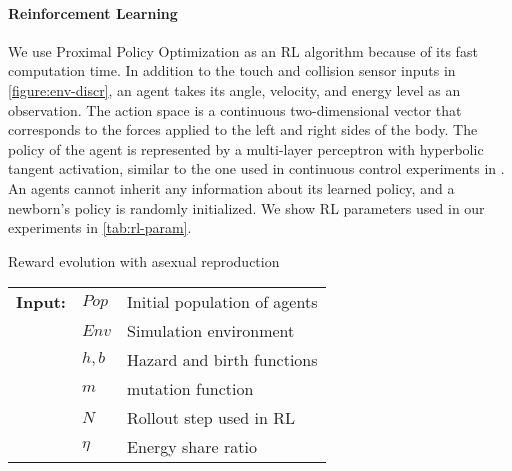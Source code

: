 \paragraph{Reinforcement Learning}
We use Proximal Policy Optimization \citep{schulmanProximalPolicyOptimization2017} as an RL algorithm because of its fast computation time. In addition to the touch and collision sensor inputs in \cref{figure:env-discr}, an agent takes its angle, velocity, and energy level as an observation. The action space is a continuous two-dimensional vector that corresponds to the forces applied to the left and right sides of the body. The policy of the agent is represented by a multi-layer perceptron with hyperbolic tangent activation, similar to the one used in continuous control experiments in \citep{schulmanProximalPolicyOptimization2017}. An agents cannot inherit any information about its learned policy, and a newborn's policy is randomly initialized. We show RL parameters used in our experiments in \cref{tab:rl-param}.

\begin{algorithm}[!htb]
  \caption{Reward evolution with asexual reproduction}\label{alg:reward-evo}
  \begin{tabular}{lll}
    \textbf{Input:} & $Pop$ & Initial population of agents \\
                    & $Env$ & Simulation environment \\
                    & $h, b$ & Hazard and birth functions \\
                    & $m$ & mutation function \\
                    & $N$ & Rollout step used in RL \\
                    & $\eta$ & Energy share ratio
  \end{tabular}
  \begin{algorithmic}[1]
    \Loop{}
      \EndOnce{}
    \EndFor{}
       
      \EndWith{}
       
      \EndWith{}
    \EndFor{}
  \EndLoop{}
\end{algorithmic}
\end{algorithm}

